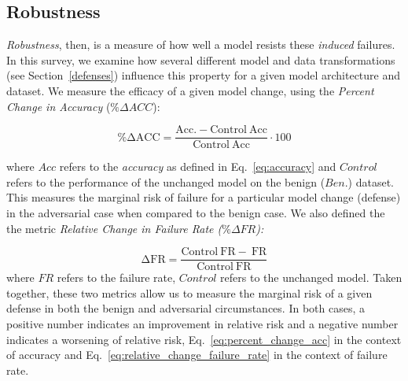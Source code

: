 \documentclass[lettersize,journal]{IEEEtran}
\newcommand{\ie}{\textit{i.e.}\xspace}
\newcommand{\probP}{\text{I\kern-0.15em P}}
\begin{document}
\subsection{Robustness}
\textit{Robustness}, then, is a measure of how well a model resists these \textit{induced} failures. In this survey, we examine how several different model and data transformations (see Section~\ref{defenses}) influence this property for a given model architecture and dataset. We measure the efficacy of a given model change, using the \textit{Percent Change in Accuracy} ($\%\Delta ACC$):

\begin{equation}
    \label{eq:percent_change_acc}
    \mathrm{\%\Delta ACC = 
        \frac{Acc.-Control~Acc}{Control~Acc}} \cdot 100
\end{equation}

where $Acc$ refers to the \textit{accuracy} as defined in Eq.~\ref{eq:accuracy} and $Control$ refers to the performance of the unchanged model on the benign ($Ben.$) dataset. This measures the marginal risk of failure for a particular model change (defense) in the adversarial case when compared to the benign case. We also defined the the metric \textit{Relative Change in Failure Rate ($\% \Delta FR $):}

\begin{equation}
\label{eq:relative_change_failure_rate}
\mathrm{\Delta FR} = 
    \frac{\mathrm{Control~FR-~FR}}{\mathrm{Control~FR}}
\end{equation}
where $FR$ refers to the failure rate, $Control$ refers to the unchanged model. Taken together, these two metrics allow us to measure the marginal risk of a given defense in both the benign and adversarial circumstances. In both cases, a positive number indicates an improvement in relative risk and a negative number indicates a worsening of relative risk, Eq.~\ref{eq:percent_change_acc} in the context of accuracy and Eq.~\ref{eq:relative_change_failure_rate} in the context of failure rate.

\end{document}
